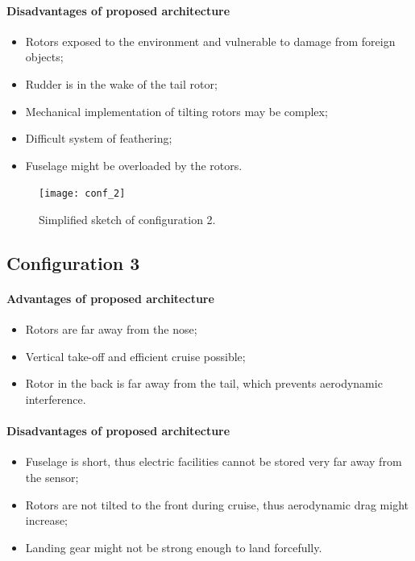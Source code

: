 \documentclass[english,fira]{ist-report}
\begin{document}
\paragraph{Disadvantages of proposed architecture}
\begin{itemize}
	\item Rotors exposed to the environment and vulnerable to damage from foreign objects;
	\item Rudder is in the wake of the tail rotor;
	\item Mechanical implementation of tilting rotors may be complex;
	\item Difficult system of feathering;
	\item Fuselage might be overloaded by the rotors.
\end{itemize}

\begin{figure}[ht]
	\centering
	\texttt{[image: conf\_2]}
	\caption{Simplified sketch of configuration 2.}
	\label{fig:conf_2}
\end{figure}

\subsection{Configuration 3}

\paragraph{Advantages of proposed architecture}
\begin{itemize}
	\item Rotors are far away from the nose;
	\item Vertical take-off and efficient cruise possible;
	\item Rotor in the back is far away from the tail, which prevents aerodynamic interference.
\end{itemize}

\paragraph{Disadvantages of proposed architecture}
\begin{itemize}
	\item Fuselage is short, thus electric facilities cannot be stored very far away from the sensor;
	\item Rotors are not tilted to the front during cruise, thus aerodynamic drag might increase;
	\item Landing gear might not be strong enough to land forcefully.
\end{itemize}
\end{document}
